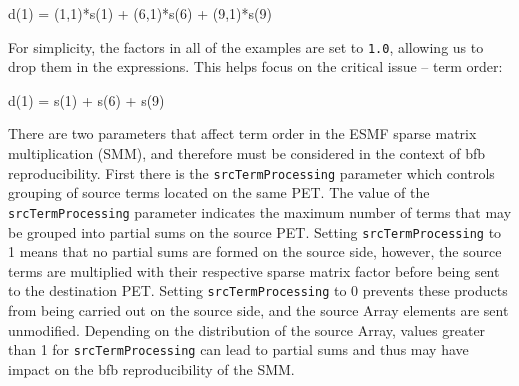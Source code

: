        d(1) = (1,1)*s(1) + (6,1)*s(6) + (9,1)*s(9)
  
   For simplicity, the factors in all of the examples are set to {\tt 1.0}, allowing us
   to drop them in the expressions. This helps focus on the critical issue -- 
   term order:
  
       d(1) = s(1) + s(6) + s(9)
  
   \begin{sloppypar}
   There are two parameters that affect term order in the ESMF sparse matrix
   multiplication (SMM), and therefore must be considered in the context of bfb
   reproducibility. First there is the {\tt srcTermProcessing} parameter which
   controls grouping of source terms located on the same PET. The value of the
   {\tt srcTermProcessing} parameter indicates the maximum number of terms that
   may be grouped into partial sums on the source PET. Setting
   {\tt srcTermProcessing} to 1 means that no partial sums are formed on the 
   source side, however, the source terms are multiplied with their
   respective sparse matrix factor before being sent to the destination PET. 
   Setting {\tt srcTermProcessing} to 0 prevents these products from being carried
   out on the source side, and the source Array elements are sent unmodified.
   Depending on the distribution of the source Array, values greater than 1
   for {\tt srcTermProcessing} can lead to partial sums and thus may have
   impact on the bfb reproducibility of the SMM.
   \end{sloppypar}
  

